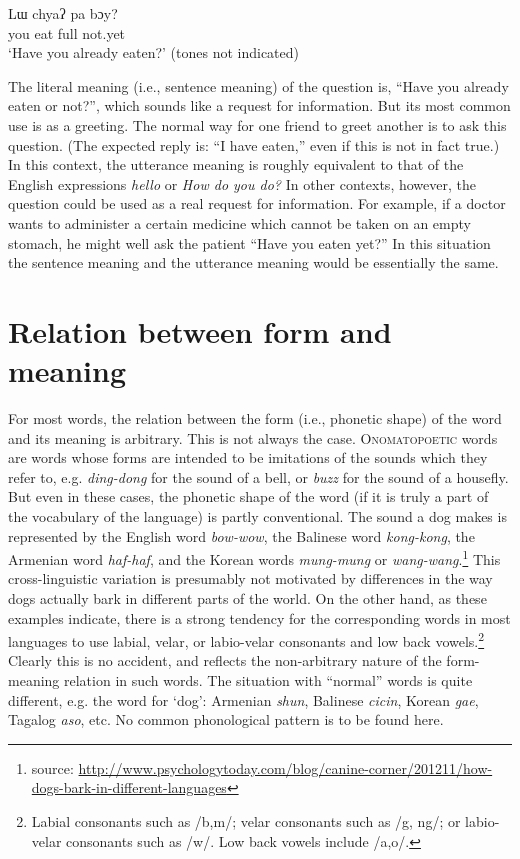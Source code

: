 \ea \label{ex:2}
Lɯ  chyaʔ  pa  bɔy?\\
you  eat  full  not.yet\\
‘Have you already eaten?’  (tones not indicated)
\z


The literal meaning (i.e., sentence meaning) of the question is, “Have you already eaten or not?”, which sounds like a request for information. But its most common use is as a greeting. The normal way for one friend to greet another is to ask this question. (The expected reply is: “I have eaten,” even if this is not in fact true.) In this context, the utterance meaning is roughly equivalent to that of the English expressions \textit{hello} or \textit{How do you do?} In other contexts, however, the question could be used as a real request for information. For example, if a doctor wants to administer a certain medicine which cannot be taken on an empty stomach, he might well ask the patient “Have you eaten yet?” In this situation the sentence meaning and the utterance meaning would be essentially the same.


\section{Relation between form and meaning}\label{sec:1.3}

For most words, the relation between the form (i.e., phonetic shape) of the word and its meaning is arbitrary. This is not always the case. \textsc{Onomatopoetic} words are words whose forms are intended to be imitations of the sounds which they refer to, e.g. \textit{ding-dong} for the sound of a bell, or \textit{buzz} for the sound of a housefly. But even in these cases, the phonetic shape of the word (if it is truly a part of the vocabulary of the language) is partly conventional. The sound a dog makes is represented by the English word \textit{bow-wow}, the Balinese word \textit{kong-kong}, the Armenian word \textit{haf-haf}, and the Korean words \textit{mung-mung} or \textit{wang-wang}.\footnote{source: \url{http://www.psychologytoday.com/blog/canine-corner/201211/how-dogs-bark-in-different-languages}} This cross-linguistic variation is presumably not motivated by differences in the way dogs actually bark in different parts of the world. On the other hand, as these examples indicate, there is a strong tendency for the corresponding words in most languages to use labial, velar, or labio-velar consonants and low back vowels.\footnote{Labial consonants such as /b,m/; velar consonants such as /g, ng/; or labio-velar consonants such as /w/. Low back vowels include /a,o/.} Clearly this is no accident, and reflects the non-arbitrary nature of the form-meaning relation in such words. The situation with “normal” words is quite different, e.g. the word for ‘dog’: Armenian \textit{shun}, Balinese \textit{cicin}, Korean \textit{gae}, Tagalog \textit{aso}, etc. No common phonological pattern is to be found here.



